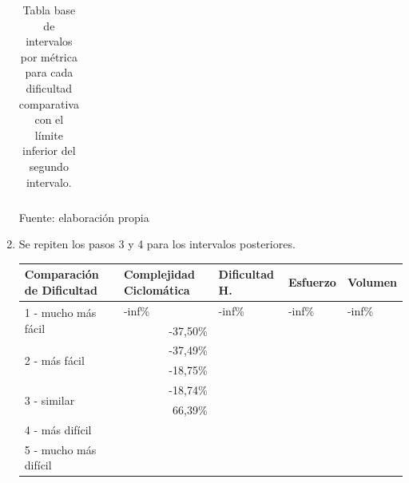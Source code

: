 \documentclass[letterpaper,12pt]{article}
\begin{document}
\begin{enumerate}
\begin{table}[H]
\begin{tabular}{|l|l|l|l|l|}
          \end{tabular}
          \caption{Tabla base de intervalos por métrica para cada dificultad comparativa con el límite inferior del segundo intervalo.} Fuente: elaboración propia
          \label{tab:base-int-table-2}
        \end{table}
  \item Se repiten los pasos 3 y 4 para los intervalos posteriores.
        \begin{table}[H]
          \centering
          \begin{tabular}{|l|l|l|l|l|}
            \hline
            \textbf{Comparación de Dificultad}     & \textbf{Complejidad Ciclomática} & \textbf{Dificultad H.} & \textbf{Esfuerzo} & \textbf{Volumen} \\ \hline
            \multirow{2}{*}{1 - mucho más fácil}   & -inf\%                           & -inf\%                 & -inf\%            & -inf\%           \\ \cline{2-5}
                                                   & \multicolumn{1}{r|}{-37,50\%}    &                        &                   &                  \\ \hline
            \multirow{2}{*}{2 - más fácil}         & \multicolumn{1}{r|}{-37,49\%}    &                        &                   &                  \\ \cline{2-5}
                                                   & \multicolumn{1}{r|}{-18,75\%}    &                        &                   &                  \\ \hline
            \multirow{2}{*}{3 - similar}           & \multicolumn{1}{r|}{-18,74\%}    &                        &                   &                  \\ \cline{2-5}
                                                   & \multicolumn{1}{r|}{66,39\%}     &                        &                   &                  \\ \hline
            \multirow{2}{*}{4 - más difícil}       &                                  &                        &                   &                  \\ \cline{2-5}
                                                   &                                  &                        &                   &                  \\ \hline
            \multirow{2}{*}{5 - mucho más difícil} &                                  &                        &                   &                  \\ \cline{2-5}

\end{tabular}
\end{table}
\end{enumerate}
\end{document}

